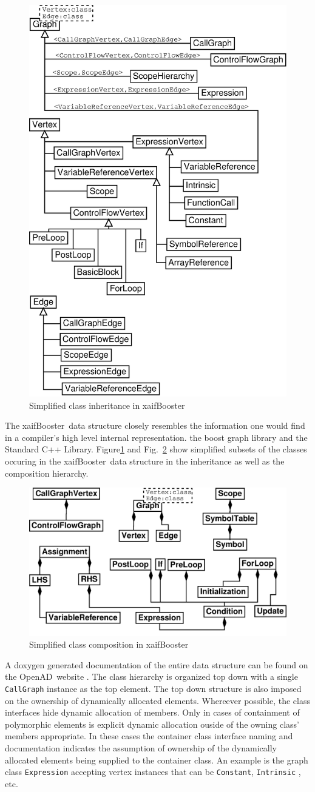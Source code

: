 \documentclass[11pt]{article}
\newcommand{\OpenAD}{OpenAD}
\newcommand{\xaifBooster}{xaifBooster}
\newcommand{\code}[1]{{\small\tt{#1}}}
\newcommand{\reffig}[1]{{Fig.~\ref{#1}}}
\newcommand{\reffigBS}[1]{{Figure\ref{#1}}}
\begin{document}
\begin{figure}
\centering \includegraphics[width=.45\textwidth]{irInh}
\caption{Simplified class inheritance in \xaifBooster} \label{fig:iri}
\end{figure}

The \xaifBooster\ data structure  
closely resembles the information one would find in a 
compiler's high level internal representation. 
the boost graph library \cite{boostWeb}
and the Standard C++ Library\cite{libstdcWeb}.
\reffigBS{fig:iri} and \reffig{fig:irc} show simplified subsets of the classes 
occuring in the \xaifBooster\ data structure in the inheritance 
as well as the composition hierarchy.  
\begin{figure}[htb]
\centering \includegraphics[width=.45\textwidth]{irComp}
\caption{Simplified class composition in \xaifBooster} \label{fig:irc}
\end{figure}
A doxygen generated documentation of the entire data structure 
can be found on the \OpenAD\ website \cite{openadWeb}.
The class hierarchy is organized top down with 
a single \code{CallGraph} instance as the top element. 
The top down structure is also imposed on the ownership of dynamically 
allocated elements. 
Whereever possible, the class interfaces hide dynamic 
allocation of members.  
Only in cases of containment of polymorphic elements is explicit dynamic allocation 
ouside of the owning class' members appropriate. 
In these cases the container class interface naming and documentation 
indicates the assumption of ownership of 
the dynamically allocated elements being supplied to the container class. 
An example is the graph class \code{Expression} accepting vertex instances that can be 
\code{Constant}, \code{Intrinsic} , etc.
\end{document}

